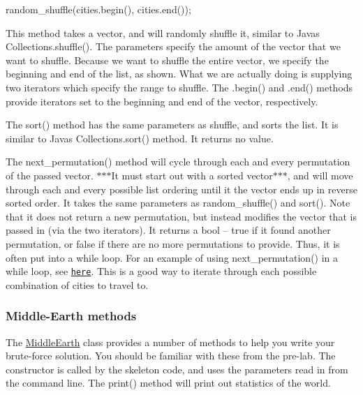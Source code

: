 \begin{DoxyCode}
random\_shuffle(cities.begin(), cities.end());
\end{DoxyCode}


This method takes a vector, and will randomly shuffle it, similar to Java\textquotesingle{}s {\ttfamily Collections.\+shuffle()}. The parameters specify the amount of the vector that we want to shuffle. Because we want to shuffle the entire vector, we specify the beginning and end of the list, as shown. What we are actually doing is supplying two iterators which specify the range to shuffle. The {\ttfamily .begin()} and {\ttfamily .end()} methods provide iterators set to the beginning and end of the vector, respectively.

The {\ttfamily sort()} method has the same parameters as shuffle, and sorts the list. It is similar to Java\textquotesingle{}s {\ttfamily Collections.\+sort()} method. It returns no value.

The {\ttfamily next\+\_\+permutation()} method will cycle through each and every permutation of the passed vector. $\ast$$\ast$$\ast$\+It must start out with a sorted vector$\ast$$\ast$$\ast$, and will move through each and every possible list ordering until it the vector ends up in reverse sorted order. It takes the same parameters as {\ttfamily random\+\_\+shuffle()} and {\ttfamily sort()}. Note that it does not return a new permutation, but instead modifies the vector that is passed in (via the two iterators). It returns a bool -- {\ttfamily true} if it found another permutation, or {\ttfamily false} if there are no more permutations to provide. Thus, it is often put into a {\ttfamily while} loop. For an example of using {\ttfamily next\+\_\+permutation()} in a while loop, see \href{http://www.cplusplus.com/reference/algorithm/next_permutation/}{\tt here}. This is a good way to iterate through each possible combination of cities to travel to.

\subsubsection*{Middle-\/\+Earth methods}

The \hyperlink{class_middle_earth}{Middle\+Earth} class provides a number of methods to help you write your brute-\/force solution. You should be familiar with these from the pre-\/lab. The constructor is called by the skeleton code, and uses the parameters read in from the command line. The {\ttfamily print()} method will print out statistics of the world.

